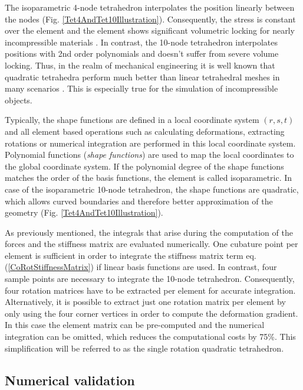 The isoparametric 4-node tetrahedron interpolates the position linearly between the nodes (Fig. \ref{Tet4AndTet10Illustration}). Consequently, the stress is constant over the element and the element shows significant volumetric locking for nearly incompressible materials \cite{Belytschko2000}. In contrast, the 10-node tetrahedron interpolates positions with 2nd order polynomials and doesn't suffer from severe volume locking. Thus, in the realm of mechanical engineering it is well known that quadratic tetrahedra perform much better than linear tetrahedral meshes in many scenarios \cite{Cifuentes1992}. This is especially true for the simulation of incompressible objects.

Typically, the shape functions are defined in a local coordinate system $(r,s,t)$ and all element based operations such as calculating deformations, extracting rotations or numerical integration are performed in this local coordinate system. Polynomial functions (\emph{shape functions}) are used to map the local coordinates to the global coordinate system. If the polynomial degree of the shape functions matches the order of the basis functions, the element is called isoparametric. In case of the isoparametric 10-node tetrahedron, the shape functions are quadratic, which allows curved boundaries and therefore better approximation of the geometry (Fig. \ref{Tet4AndTet10Illustration}). 

As previously mentioned, the integrals that arise during the computation of the forces and the stiffness matrix are evaluated numerically. One cubature point per element is sufficient in order to integrate the stiffness matrix term eq. (\ref{CoRotStiffnessMatrix}) if linear basis functions are used. In contrast, four sample points are necessary to integrate the 10-node tetrahedron. Consequently, four rotation matrices have to be extracted per element for accurate integration. Alternatively, it is possible to extract just one rotation matrix per element by only using the four corner vertices in order to compute the deformation gradient. In this case the element matrix can be pre-computed and the numerical integration can be omitted, which reduces the computational costs by 75\%. This simplification will be referred to as the single rotation quadratic tetrahedron.


\subsection{Numerical validation}

